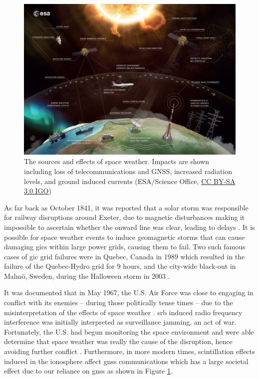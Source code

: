 \begin{figure}[ht!]
	\centering
	\includegraphics[width=\columnwidth]{Space_weather_effects_rescaled.jpg}
	\caption{The sources and effects of space weather. Impacts are shown including loss of telecommunications and GNSS, increased radiation levels, and ground induced currents (ESA/Science Office, \href{http://www.esa.int/spaceinimages/ESA_Multimedia/Copyright_Notice_Images}{CC BY-SA 3.0 IGO})}
	\label{fig:space_weather_impacts}
\end{figure}

\vspace{1em}

As far back as October 1841, it was reported that a solar storm was responsible for railway disruptions around Exeter, due to magnetic disturbances making it impossible to ascertain whether the onward line was clear, leading to delays \citep{nature_observations_1871}. It is possible for space weather events to induce geomagnetic storms that can cause damaging \glspl{gic} within large power grids, causing them to fail. Two such famous cases of \gls{gic} grid failures were in Quebec, Canada in 1989 which resulted in the failure of the Quebec-Hydro grid for 9 hours, and the city-wide black-out in Malm{\"o}, Sweden, during the Halloween storm in 2003 \citep{viljanen_european_2011, beggan_ground_2018}.

It was documented that in May 1967, the U.S. Air Force was close to engaging in conflict with its enemies -- during those politically tense times -- due to the misinterpretation of the effects of space weather \citep{knipp_may_2016}. \gls{srb} induced radio frequency interference was initially interpreted as surveillance jamming, an act of war. Fortunately, the U.S. had begun monitoring the space environment and were able determine that space weather was really the cause of the disruption, hence avoiding further conflict \citep{knipp_may_2016}. Furthermore, in more modern times, scintillation effects induced in the ionosphere affect \gls{gnss} communications which has a large societal effect due to our reliance on \gls{gnss} \citep{cannon_extreme_2013} as shown in Figure \ref{fig:space_weather_impacts}.

